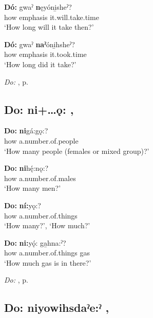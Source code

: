 \ea
\label{ex:dpart52}
\gll \textbf{Dó:} gwaˀ \textbf{n}ęyóni̱sheˀ? \\
how emphasis it.will.take.time\\
\glt ‘How long will it take then?’
\z

\ea
\label{ex:dpart53}
\gll \textbf{Dó:} gwaˀ \textbf{naˀ}óni̱hsheˀ? \\
how emphasis it.took.time \\
\glt ‘How long did it take?’
\z

\begin{CayugaRelated}
\item \textit{Do:} , p. \pageref{p:[do:]}
\end{CayugaRelated}

\subsection*{\textbf{Do: ni+…ǫ:} , } \label{p:[do: ni+…ǫ:]}

\ea
\label{ex:dpart54}
\gll \textbf{Do:} \textbf{ni}gá:gǫ:? \\
how a.number.of.people \\
\glt ‘How many people (females or mixed group)?’
\z

\ea
\label{ex:dpart55}
\gll \textbf{Do:} \textbf{ni}hę́:nǫ:? \\
how a.number.of.males \\
\glt ‘How many men?’
\z

\ea
\label{ex:dpart56}
\gll \textbf{Do:} \textbf{ní:}yǫ:? \\
how a.number.of.things \\
\glt ‘How many?’, `How much?’
\z

\ea
\label{ex:dpart57}
\gll \textbf{Do:} \textbf{ni:}yǫ́: ga̱hna:ˀ? \\
how a.number.of.things gas\\
\glt ‘How much gas is in there?’
\z

\begin{CayugaRelated}
\item \textit{Do:} , p. \pageref{p:[do:]}
\end{CayugaRelated}

\subsection*{\textbf{Do: niyowihsdaˀe:ˀ} , } \label{p:[do: niyowihsdaˀe:ˀ]}

